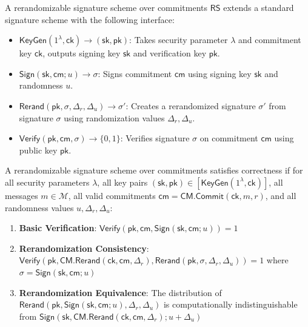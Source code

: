 \begin{definition}
A rerandomizable signature scheme over commitments $\mathsf{RS}$ extends a standard signature scheme with the following interface:
\begin{itemize}
    \item $\mathsf{KeyGen}(1^\lambda, \mathsf{ck}) \rightarrow (\mathsf{sk}, \mathsf{pk})$: Takes security parameter $\lambda$ and commitment key $\mathsf{ck}$, outputs signing key $\mathsf{sk}$ and verification key $\mathsf{pk}$.
    
    \item $\mathsf{Sign}(\mathsf{sk}, \mathsf{cm}; u) \rightarrow \sigma$: Signs commitment $\mathsf{cm}$ using signing key $\mathsf{sk}$ and randomness $u$.
    
    \item $\mathsf{Rerand}(\mathsf{pk}, \sigma, \Delta_r, \Delta_u) \rightarrow \sigma'$: Creates a rerandomized signature $\sigma'$ from signature $\sigma$ using randomization values $\Delta_r, \Delta_u$.
    
    \item $\mathsf{Verify}(\mathsf{pk}, \mathsf{cm}, \sigma) \rightarrow \{0,1\}$: Verifies signature $\sigma$ on commitment $\mathsf{cm}$ using public key $\mathsf{pk}$.
\end{itemize}
\end{definition}

\begin{definition}[Correctness]
A rerandomizable signature scheme over commitments satisfies correctness if for all security parameters $\lambda$, all key pairs $(\mathsf{sk}, \mathsf{pk}) \in [\mathsf{KeyGen}(1^\lambda, \mathsf{ck})]$, all messages $m \in \mathcal{M}$, all valid commitments $\mathsf{cm} = \mathsf{CM.Commit}(\mathsf{ck}, m, r)$, and all randomness values $u, \Delta_r, \Delta_u$:

\begin{enumerate}
    \item \textbf{Basic Verification}: $\mathsf{Verify}(\mathsf{pk}, \mathsf{cm}, \mathsf{Sign}(\mathsf{sk}, \mathsf{cm}; u)) = 1$
    
    \item \textbf{Rerandomization Consistency}: $\mathsf{Verify}(\mathsf{pk}, \mathsf{CM.Rerand}(\mathsf{ck}, \mathsf{cm}, \Delta_r), \mathsf{Rerand}(\mathsf{pk}, \sigma, \Delta_r, \Delta_u)) = 1$ where $\sigma = \mathsf{Sign}(\mathsf{sk}, \mathsf{cm}; u)$
    
    \item \textbf{Rerandomization Equivalence}: The distribution of $\mathsf{Rerand}(\mathsf{pk}, \mathsf{Sign}(\mathsf{sk}, \mathsf{cm}; u), \Delta_r, \Delta_u)$ is computationally indistinguishable from $\mathsf{Sign}(\mathsf{sk}, \mathsf{CM.Rerand}(\mathsf{ck}, \mathsf{cm}, \Delta_r); u+\Delta_u)$
\end{enumerate}
\end{definition}


